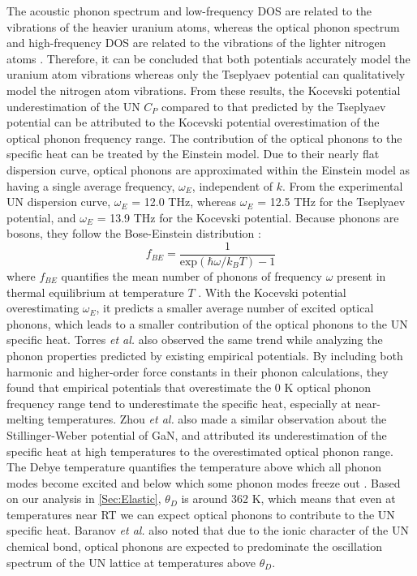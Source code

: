 \documentclass[preprint, 12pt]{elsarticle}
\begin{document}
The acoustic phonon spectrum and low-frequency DOS are related to the vibrations of the heavier uranium atoms, whereas the optical phonon spectrum and high-frequency DOS are related to the vibrations of the lighter nitrogen atoms \cite{Baranov2013, Boer2018}. Therefore, it can be concluded that both potentials accurately model the uranium atom vibrations whereas only the Tseplyaev potential can qualitatively model the nitrogen atom vibrations. From these results, the Kocevski potential underestimation of the UN $C_P$ compared to that predicted by the Tseplyaev potential can be attributed to the Kocevski potential overestimation of the optical phonon frequency range. The contribution of the optical phonons to the specific heat can be treated by the Einstein model. Due to their nearly flat dispersion curve, optical phonons are approximated within the Einstein model as having a single average frequency, $\omega_E$, independent of $k$. From the experimental UN dispersion curve, $\omega_E$ = 12.0 THz, whereas $\omega_E$ = 12.5 THz for the Tseplyaev potential, and $\omega_E$ = 13.9 THz for the Kocevski potential. Because phonons are bosons, they follow the Bose-Einstein distribution \cite{Boer2018}:
\begin{equation}
f_{BE} = \frac{1}{\mathrm{exp} \left( \hbar \omega / k_B T \right)-1}
\label{Eq:Bose}
\end{equation}
where $f_{BE}$ quantifies the mean number of phonons of frequency $\omega$ present in thermal equilibrium at temperature $T$ \cite{Ashcroft1976}. With the Kocevski potential overestimating $\omega_E$, it predicts a smaller average number of excited optical phonons, which leads to a smaller contribution of the optical phonons to the UN specific heat. Torres \textit{et al.} \cite{Torres2020} also observed the same trend while analyzing the phonon properties predicted by existing  empirical potentials. By including both harmonic and higher-order force constants in their phonon calculations, they found that  empirical potentials that overestimate the 0 K optical phonon frequency range tend to underestimate the specific heat, especially at near-melting temperatures. Zhou \textit{et al.} \cite{Zhou2009} also made a similar observation about the Stillinger-Weber potential of GaN, and attributed its underestimation of the specific heat at high temperatures to the overestimated optical phonon range. The Debye temperature quantifies the temperature above which all phonon modes become excited and below which some phonon modes freeze out \cite{Ashcroft1976}. Based on our analysis in \cref{Sec:Elastic}, $\theta_D$ is around 362 K, which means that even at temperatures near RT we can expect optical phonons to contribute to the UN specific heat. Baranov \textit{et al.} \cite{Baranov2013} also noted that due to the ionic character of the UN chemical bond, optical phonons are expected to predominate the oscillation spectrum of the UN lattice at temperatures above $\theta_D$.
\end{document}
